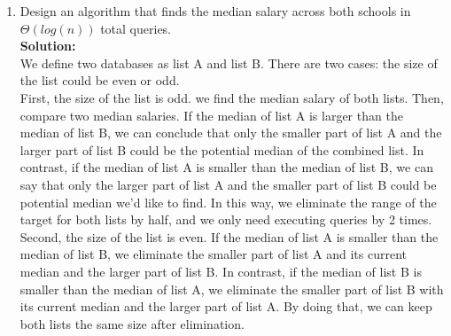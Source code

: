 \documentclass[10pt]{article}
\begin{document}
\begin{enumerate}
    \item Design an algorithm that finds the median salary across both schools in $\Theta(log(n))$ total queries. \\
    \textbf{Solution:} \\ We define two databases as list A and list B. There are two cases: the size of the list could be even or odd. \\
    
    First, the size of the list is odd. we find the median salary of both lists. Then, compare two median salaries. If the median of list A is larger than the median of list B, we can conclude that only the smaller part of list A and the larger part of list B could be the potential median of the combined list. In contrast, if the median of list A is smaller than the median of list B, we can say that only the larger part of list A and the smaller part of list B could be potential median we'd like to find. In this way, we eliminate the range of the target for both lists by half, and we only need executing queries by 2 times. \\
    
    Second, the size of the list is even. If the median of list A is smaller than the median of list B, we eliminate the smaller part of list A and its current median and the larger part of list B. In contrast, if the median of list B is smaller than the median of list A, we eliminate the smaller part of list B with its current median and the larger part of list A. By doing that, we can keep both lists the same size after elimination. \\
    

\end{enumerate}
\end{document}

